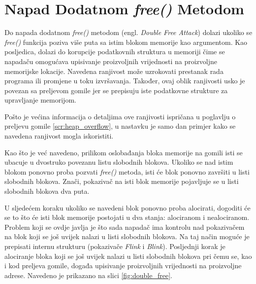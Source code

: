\documentclass[times, utf8, diplomski, numeric]{fer}
\begin{document}
\section{Napad Dodatnom \emph{free()} Metodom}
Do napada dodatnom \emph{free()} metodom (engl. \emph{Double Free Attack}) dolazi ukoliko se \emph{free()} funkcija poziva više puta sa istim blokom memorije kao argumentom. Kao posljedica, dolazi do korupcije podatkovnih struktura u memoriji čime se napadaču omogućava upisivanje proizvoljnih vrijednosti na proizvoljne memorijske lokacije. Navedena ranjivost može uzrokovati prestanak rada programa ili promjene u toku izvršavanja. Također, ovaj oblik ranjivosti usko je povezan sa preljevom gomile jer se prepisuju iste podatkovne strukture za upravljanje memorijom.

Pošto je većina informacija o detaljima ove ranjivosti ispričana u poglavlju o preljevu gomile \ref{scr:heap_overflow}, u nastavku je samo dan primjer kako se navedena ranjivost mogla iskoristiti.

Kao što je već navedeno, prilikom oslobađanja bloka memorije na gomili isti se ubacuje u dvostruko povezanu listu slobodnih blokova. Ukoliko se nad istim blokom ponovno proba pozvati \emph{free()} metoda, isti će blok ponovno završiti u listi slobodnih blokova. Znači, pokazivač na isti blok memorije pojavljuje se u listi slobodnih blokova dva puta.

U sljedećem koraku ukoliko se navedeni blok ponovno proba alocirati, dogoditi će se to što će isti blok memorije postojati u dva stanja: alociranom i nealociranom. Problem koji se ovdje javlja je što sada napadač ima kontrolu nad pokazivačem na blok koji se još uvijek nalazi u listi slobodnih blokova. Na taj način moguće je prepisati internu strukturu (pokazivače \emph{Flink} i \emph{Blink}). Posljednji korak je alociranje bloka koji se još uvijek nalazi u listi slobodnih blokova pri čemu se, kao i kod preljeva gomile, događa upisivanje proizvoljnih vrijednosti na proizvoljne adrese. Navedeno je prikazano na slici \ref{fig:double_free}.
\end{document}
